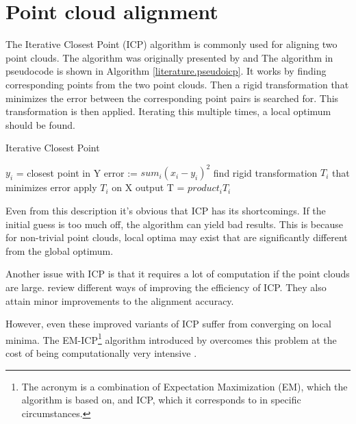 \section{Point cloud alignment} \label{literature.alignment}


The Iterative Closest Point (ICP) algorithm is commonly used for aligning two point clouds. The algorithm was originally presented by \citet{besl1992method} and \citet{chen1991object} The algorithm in pseudocode is shown in Algorithm \ref{literature.pseudoicp}. It works by finding corresponding points from the two point clouds. Then a rigid transformation that minimizes the error between the corresponding point pairs is searched for. This transformation is then applied. Iterating this multiple times, a local optimum should be found.

\begin{algorithm}
\caption{Iterative Closest Point}
\label{literature.pseudoicp}
\begin{algorithmic}
            \State $y_i$ = closest point in Y
        \EndFor
        \State error := $sum_i (x_i-y_i)^2$
        \State find rigid transformation $T_i$ that minimizes error
        \State apply $T_i$ on X
    \EndFor
    \State \Return output T = $product_i T_i$
\end{algorithmic}
\end{algorithm}

Even from this description it's obvious that ICP has its shortcomings. If the initial guess is too much off, the algorithm can yield bad results. This is because for non-trivial point clouds, local optima may exist that are significantly different from the global optimum.

Another issue with ICP is that it requires a lot of computation if the point clouds are large. \citet{rusinkiewicz2001efficient} review different ways of improving the efficiency of ICP. They also attain minor improvements to the alignment accuracy.

However, even these improved variants of ICP suffer from converging on local minima. The EM-ICP\footnote{The acronym is a combination of Expectation Maximization (EM), which the algorithm is based on, and ICP, which it corresponds to in specific circumstances.} algorithm introduced by \citet{granger2006multi} overcomes this problem at the cost of being computationally very intensive \citep{tamaki2010softassign}.


